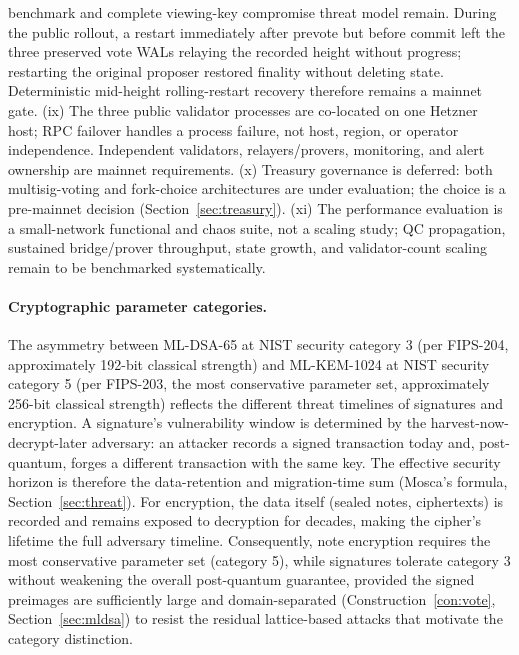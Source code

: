 \documentclass[11pt]{article}
\newcommand{\mldsa}{ML\mbox{-}DSA\mbox{-}65}
\newcommand{\mlkem}{ML\mbox{-}KEM\mbox{-}1024}
\theoremstyle{plain}
\theoremstyle{definition}
\theoremstyle{remark}
\begin{document}
benchmark and complete viewing-key compromise threat model remain. During the
public rollout, a restart immediately after prevote but before commit left the
three preserved vote WALs relaying the recorded height without progress;
restarting the original proposer restored finality without deleting state.
Deterministic mid-height rolling-restart recovery therefore remains a mainnet
gate. (ix) The three public validator processes are co-located on one
Hetzner host; RPC failover handles a process failure, not host, region, or
operator independence. Independent validators, relayers/provers, monitoring,
and alert ownership are mainnet requirements. (x) Treasury governance is
deferred: both multisig-voting and fork-choice architectures are under
evaluation; the choice is a pre-mainnet decision
(Section~\ref{sec:treasury}). (xi) The performance evaluation is a small-network
functional and chaos suite, not a scaling study; QC propagation, sustained
bridge/prover throughput, state growth, and validator-count scaling remain to
be benchmarked systematically.

\paragraph{Cryptographic parameter categories.} The asymmetry between \mldsa{}
at NIST security category 3 (per FIPS-204, approximately 192-bit classical
strength) and \mlkem{} at NIST security category 5 (per FIPS-203, the
most conservative parameter set, approximately 256-bit classical strength)
reflects the different threat timelines of signatures and encryption. A
signature's vulnerability window is determined by the harvest-now-decrypt-later
adversary: an attacker records a signed transaction today and, post-quantum,
forges a different transaction with the same key. The effective security horizon
is therefore the data-retention and migration-time sum (Mosca's formula,
Section~\ref{sec:threat}). For encryption, the data itself (sealed notes,
ciphertexts) is recorded and remains exposed to decryption for decades, making
the cipher's lifetime the full adversary timeline. Consequently, note encryption
requires the most conservative parameter set (category 5), while signatures
tolerate category 3 without weakening the overall post-quantum guarantee,
provided the signed preimages are sufficiently large and domain-separated
(Construction~\ref{con:vote}, Section~\ref{sec:mldsa}) to resist the residual
lattice-based attacks that motivate the category distinction.

\end{document}
